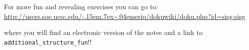 For more fun and revealing exercises you can go to:\\
\def\urltilde{\kern -.15em\lower .7ex\hbox{\~{}}\kern .04em}
{\small \href{http://users.soe.ucsc.edu/~eriq/dokuwiki/doku.php?id=sisg:sisg}{http://users.soe.ucsc.edu/\urltilde eriq/dokuwiki/doku.php?id=sisg:sisg}}

where you will find an electronic version of the notes and a link to {\tt additional\_structure\_fun}!!




 
